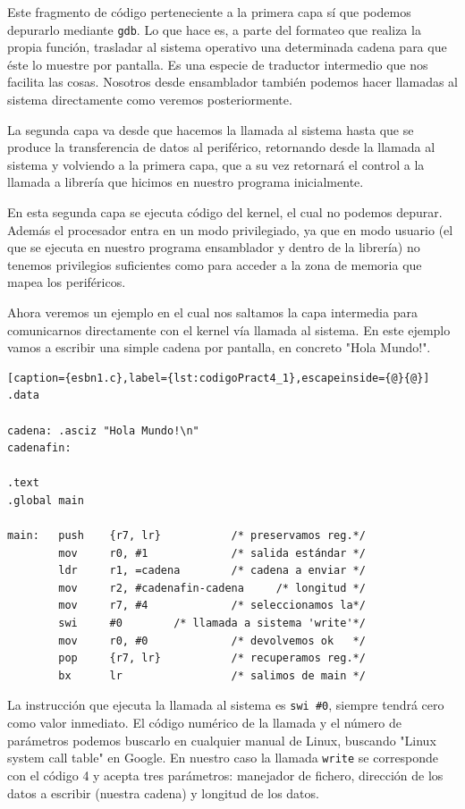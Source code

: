 Este fragmento de código perteneciente a la primera capa sí que podemos
depurarlo mediante {\tt gdb}. Lo que hace es, a parte del formateo que
realiza la propia función, trasladar al sistema operativo una determinada
cadena para que éste lo muestre por pantalla. Es una especie de traductor
intermedio que nos facilita las cosas. Nosotros desde ensamblador también
podemos hacer llamadas al sistema directamente como veremos posteriormente.

La segunda capa va desde que hacemos la llamada al sistema hasta que se
produce la transferencia de datos al periférico, retornando desde la llamada
al sistema y volviendo a la primera capa, que a su vez retornará el control
a la llamada a librería que hicimos en nuestro programa inicialmente.

En esta segunda capa se ejecuta código del kernel, el cual no podemos depurar.
Además el procesador entra en un modo privilegiado, ya que en modo usuario (el
que se ejecuta en nuestro programa ensamblador y dentro de la librería) no
tenemos privilegios suficientes como para acceder a la zona de memoria que
mapea los periféricos.

Ahora veremos un ejemplo en el cual nos saltamos la capa intermedia para
comunicarnos directamente con el kernel vía llamada al sistema. En este ejemplo
vamos a escribir una simple cadena por pantalla, en concreto "Hola Mundo!".

\begin{lstlisting}[caption={esbn1.c},label={lst:codigoPract4_1},escapeinside={@}{@}]
.data

cadena: .asciz "Hola Mundo!\n"
cadenafin:

.text
.global main
 
main:   push    {r7, lr}           /* preservamos reg.*/
        mov     r0, #1             /* salida estándar */
        ldr     r1, =cadena        /* cadena a enviar */
        mov     r2, #cadenafin-cadena     /* longitud */
        mov     r7, #4             /* seleccionamos la*/
        swi     #0        /* llamada a sistema 'write'*/
        mov     r0, #0             /* devolvemos ok   */
        pop     {r7, lr}           /* recuperamos reg.*/
        bx      lr                 /* salimos de main */
\end{lstlisting}

La instrucción que ejecuta la llamada al sistema es {\tt swi \#0},
siempre tendrá cero como valor inmediato. El código numérico de
la llamada y el número de parámetros podemos buscarlo en cualquier
manual de Linux, buscando "Linux system call table" en Google. En
nuestro caso la llamada {\tt write} se corresponde con el código
4 y acepta tres parámetros: manejador de fichero, dirección de
los datos a escribir (nuestra cadena) y longitud de los datos.

